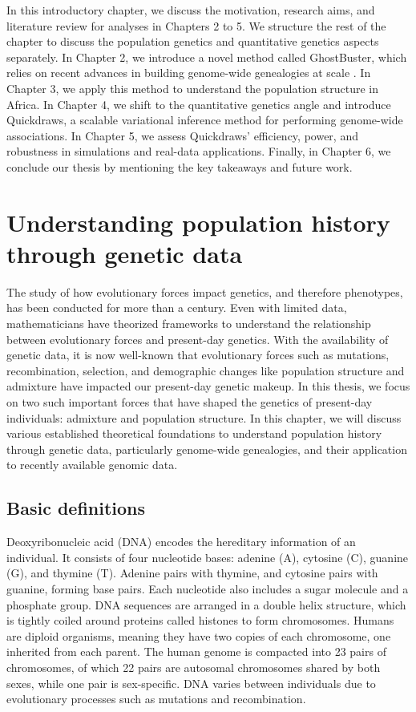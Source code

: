 In this introductory chapter, we discuss the motivation, research aims, and literature review for analyses in Chapters 2 to 5. We structure the rest of the chapter to discuss the population genetics and quantitative genetics aspects separately. In Chapter 2, we introduce a novel method called GhostBuster, which relies on recent advances in building genome-wide genealogies at scale \cite{speidel2019method, Kelleher2019, zhang2023biobank}. In Chapter 3, we apply this method to understand the population structure in Africa. In Chapter 4, we shift to the quantitative genetics angle and introduce Quickdraws, a scalable variational inference method for performing genome-wide associations. In Chapter 5, we assess Quickdraws' efficiency, power, and robustness in simulations and real-data applications. Finally, in Chapter 6, we conclude our thesis by mentioning the key takeaways and future work.

\section{Understanding population history through genetic data}

The study of how evolutionary forces impact genetics, and therefore phenotypes, has been conducted for more than a century. Even with limited data, mathematicians have theorized frameworks to understand the relationship between evolutionary forces and present-day genetics. With the availability of genetic data, it is now well-known that evolutionary forces such as mutations, recombination, selection, and demographic changes like population structure and admixture have impacted our present-day genetic makeup. In this thesis, we focus on two such important forces that have shaped the genetics of present-day individuals: admixture and population structure. In this chapter, we will discuss various established theoretical foundations to understand population history through genetic data, particularly genome-wide genealogies, and their application to recently available genomic data.

\subsection{Basic definitions}
\label{sec:ch1-gb-basic-defination}
Deoxyribonucleic acid (DNA) encodes the hereditary information of an individual. It consists of four nucleotide bases: adenine (A), cytosine (C), guanine (G), and thymine (T). Adenine pairs with thymine, and cytosine pairs with guanine, forming base pairs. Each nucleotide also includes a sugar molecule and a phosphate group. DNA sequences are arranged in a double helix structure, which is tightly coiled around proteins called histones to form chromosomes. Humans are diploid organisms, meaning they have two copies of each chromosome, one inherited from each parent. The human genome is compacted into 23 pairs of chromosomes, of which 22 pairs are autosomal chromosomes shared by both sexes, while one pair is sex-specific. DNA varies between individuals due to evolutionary processes such as mutations and recombination.

